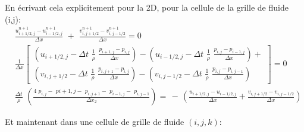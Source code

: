 \documentclass[11pt]{report}
\begin{document}
En écrivant cela explicitement pour la 2D, pour la cellule de la grille de fluide (i,j):
\begin{eqnarray}
& \frac{u_{i+1/2,j}^{n+1} - u_{i-1/2,j}^{n+1}}{\Delta x} \,\,+\,\, \frac{v_{i,j+1/2}^{n+1} - v_{i,j-1/2}^{n+1}}{\Delta x}  =  0 \\ 
& \frac{1}{\Delta x} 
	\left[
		\begin{array}{c}
			\left( 
			u_{i+1/2,j} - \Delta t \,\, \frac{1}{\rho} \,\, \frac{p_{i+1,j} - p_{i,j}}{\Delta x}
			\right) -
			\left( 
			u_{i-1/2,j} - \Delta t \,\, \frac{1}{\rho} \,\, \frac{p_{i,j} - p_{i-1,j}}{\Delta x}
			\right) +\\
			\left( 
			v_{i,j+1/2} - \Delta t \,\, \frac{1}{\rho} \,\, \frac{p_{i,j+1} - p_{i,j}}{\Delta x}
			\right) -
			\left( 
			v_{i,j-1/2} - \Delta t \,\, \frac{1}{\rho} \,\, \frac{p_{i,j} - p_{i,j-1}}{\Delta x}
			\right)
		\end{array}
	 \right] =  0 \\	 
& \frac{\Delta t}{\rho} \,\,
\left(
	 \frac{4 \,\, p_{i,j} - \,\, p{i+1,j} - \,\, p_{i,j+1} - \,\, p_{i-1,j} - \,\, p_{i,j-1}}
	 {\Delta x_2}
\right) = \, - \,	 
\left(
	\frac{u_{i+1/2,j} - u_{i-1/2,j}}
	{\Delta x} + 
	\frac{v_{i,j+1/2} - v_{i,j-1/2}}
	{\Delta x}
\right)
\end{eqnarray}

Et maintenant dans une cellule de grille de fluide $ (i,j,k) $:
\end{document}
